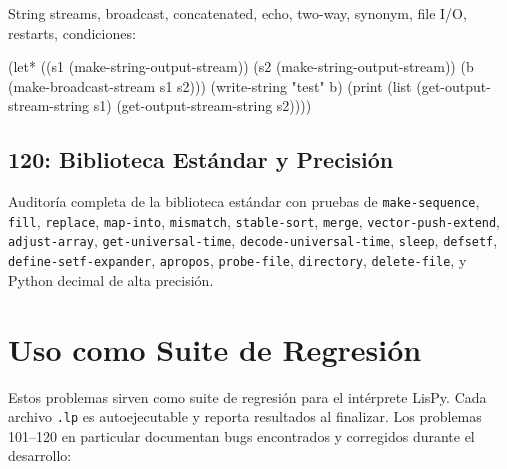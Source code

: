 String streams, broadcast, concatenated, echo, two-way, synonym,
file I/O, restarts, condiciones:

\begin{lispcode}
(let* ((s1 (make-string-output-stream))
       (s2 (make-string-output-stream))
       (b (make-broadcast-stream s1 s2)))
  (write-string "test" b)
  (print (list (get-output-stream-string s1)
               (get-output-stream-string s2))))
\end{lispcode}

\subsection*{120: Biblioteca Estándar y Precisión}

Auditoría completa de la biblioteca estándar con pruebas de
\texttt{make-sequence}, \texttt{fill}, \texttt{replace},
\texttt{map-into}, \texttt{mismatch}, \texttt{stable-sort},
\texttt{merge}, \texttt{vector-push-extend}, \texttt{adjust-array},
\texttt{get-universal-time}, \texttt{decode-universal-time},
\texttt{sleep}, \texttt{defsetf}, \texttt{define-setf-expander},
\texttt{apropos}, \texttt{probe-file}, \texttt{directory},
\texttt{delete-file}, y Python decimal de alta precisión.

\section{Uso como Suite de Regresión}

Estos problemas sirven como suite de regresión para el intérprete LisPy.
Cada archivo \texttt{.lp} es autoejecutable y reporta resultados al
finalizar. Los problemas 101--120 en particular documentan bugs encontrados
y corregidos durante el desarrollo:


